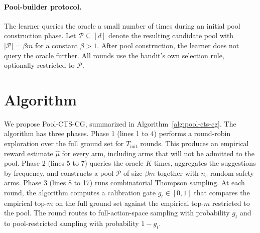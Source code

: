 \documentclass{article}
\theoremstyle{plain}
\theoremstyle{definition}
\theoremstyle{remark}
\newcommand{\Pool}{\mathcal{P}}
\newcommand{\algname}{Pool-CTS-CG}
\begin{document}
\paragraph{Pool-builder protocol.} The learner queries the oracle a small number of times during an initial pool construction phase. Let $\Pool \subseteq [d]$ denote the resulting candidate pool with $|\Pool| = \beta m$ for a constant $\beta > 1$. After pool construction, the learner does not query the oracle further. All rounds use the bandit's own selection rule, optionally restricted to $\Pool$.

\section{Algorithm}
\label{sec:algorithm}

We propose \algname{}, summarized in Algorithm~\ref{alg:pool-cts-cg}. The algorithm has three phases. Phase 1 (lines 1 to 4) performs a round-robin exploration over the full ground set for $T_{\mathrm{init}}$ rounds. This produces an empirical reward estimate $\hat{\mu}$ for every arm, including arms that will not be admitted to the pool. Phase 2 (lines 5 to 7) queries the oracle $K$ times, aggregates the suggestions by frequency, and constructs a pool $\Pool$ of size $\beta m$ together with $n_s$ random safety arms. Phase 3 (lines 8 to 17) runs combinatorial Thompson sampling. At each round, the algorithm computes a calibration gate $g_t \in [0,1]$ that compares the empirical top-$m$ on the full ground set against the empirical top-$m$ restricted to the pool. The round routes to full-action-space sampling with probability $g_t$ and to pool-restricted sampling with probability $1 - g_t$.
\end{document}
